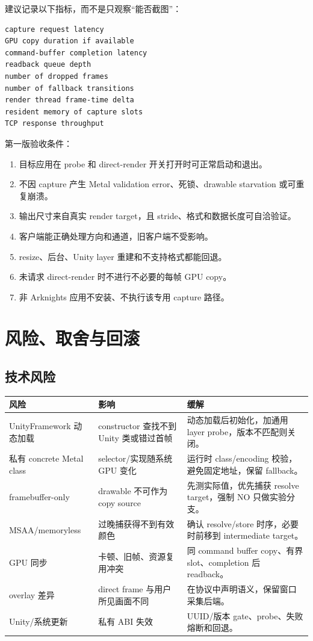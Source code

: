 \documentclass[UTF8,a4paper,11pt]{ctexart}
\begin{document}
建议记录以下指标，而不是只观察“能否截图”：

\begin{lstlisting}
capture request latency
GPU copy duration if available
command-buffer completion latency
readback queue depth
number of dropped frames
number of fallback transitions
render thread frame-time delta
resident memory of capture slots
TCP response throughput
\end{lstlisting}

第一版验收条件：

\begin{enumerate}
  \item 目标应用在 probe 和 direct-render 开关打开时可正常启动和退出。
  \item 不因 capture 产生 Metal validation error、死锁、drawable starvation 或可重复崩溃。
  \item 输出尺寸来自真实 render target，且 stride、格式和数据长度可自洽验证。
  \item 客户端能正确处理方向和通道，旧客户端不受影响。
  \item resize、后台、Unity layer 重建和不支持格式都能回退。
  \item 未请求 direct-render 时不进行不必要的每帧 GPU copy。
  \item 非 Arknights 应用不安装、不执行该专用 capture 路径。
\end{enumerate}

\section{风险、取舍与回滚}

\subsection{技术风险}

\begin{center}
\small
\begin{tabularx}{\textwidth}{>{\raggedright\arraybackslash}p{} >{\raggedright\arraybackslash}p{} X}
\toprule
风险 & 影响 & 缓解 \\
\midrule
UnityFramework 动态加载 & constructor 查找不到 Unity 类或错过首帧 & 动态加载后初始化，加通用 layer probe，版本不匹配则关闭。\\
私有 concrete Metal class & selector/实现随系统 GPU 变化 & 运行时 class/encoding 校验，避免固定地址，保留 fallback。\\
framebuffer-only & drawable 不可作为 copy source & 先测实际值，优先捕获 resolve target，强制 NO 只做实验分支。\\
MSAA/memoryless & 过晚捕获得不到有效颜色 & 确认 resolve/store 时序，必要时前移到 intermediate target。\\
GPU 同步 & 卡顿、旧帧、资源复用冲突 & 同 command buffer copy、有界 slot、completion 后 readback。\\
overlay 差异 & direct frame 与用户所见画面不同 & 在协议中声明语义，保留窗口采集后端。\\
Unity/系统更新 & 私有 ABI 失效 & UUID/版本 gate、probe、失败熔断和回退。\\
\bottomrule
\end{tabularx}
\end{center}
\end{document}
